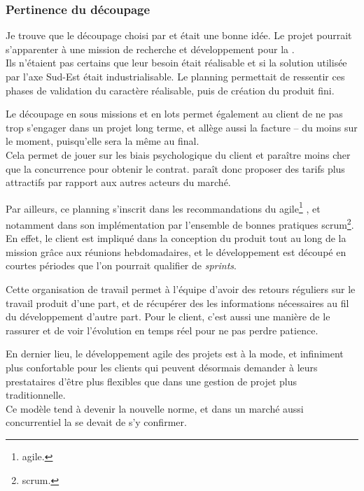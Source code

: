 \subsubsection{Pertinence du découpage}

Je trouve que le découpage choisi par \gil et \damien était une bonne idée. Le projet pourrait s'apparenter à une mission de recherche et développement pour la \sncf.\\
Ils n'étaient pas certains que leur besoin était réalisable et si la solution utilisée par l'axe Sud-Est était industrialisable. Le planning permettait de ressentir ces phases de validation du caractère réalisable, puis de création du produit fini.

Le découpage en sous missions et en lots permet également au client de ne pas trop s'engager dans un projet long terme, et allège aussi la facture -- du moins sur le moment, puisqu'elle sera la même au final.\\
Cela permet de jouer sur les biais psychologique du client et paraître moins cher que la concurrence pour obtenir le contrat. \tnp paraît donc proposer des tarifs plus attractifs par rapport aux autres acteurs du marché.

Par ailleurs, ce planning s'inscrit dans les recommandations du 
\gls{agile}\footnote{\glsdesc{agile}.}\cite{noauthor_comprehensive_nodate-2}\cite{noauthor_manifeste_nodate}
, et notamment dans son implémentation par l'ensemble de bonnes pratiques
\gls{scrum}\footnote{\glsdesc{scrum}.}\cite{noauthor_scrum_nodate}. En effet, le client est impliqué dans la conception du produit tout au long de la mission grâce aux réunions hebdomadaires, et le développement est découpé en courtes périodes que l'on pourrait qualifier de \textit{sprints}.

Cette organisation de travail permet à l'équipe d'avoir des retours réguliers sur le travail produit d'une part, et de récupérer des les informations nécessaires au fil du développement d'autre part. Pour le client, c'est aussi une manière de le rassurer et de voir l'évolution en temps réel pour ne pas perdre patience.

En dernier lieu, le développement agile des projets est à la mode, et infiniment plus confortable pour les clients qui peuvent désormais demander à leurs prestataires d'être plus flexibles que dans une gestion de projet plus traditionnelle.\\
Ce modèle tend à devenir la nouvelle norme, et dans un marché aussi concurrentiel la \df se devait de s'y confirmer.

